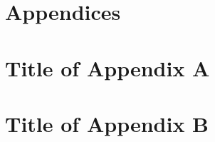 \documentclass{article}
\begin{document}

\newpage
\section{Appendices}

\appendix
\section{Title of Appendix A}
\section{Title of Appendix B}






\end{document}
